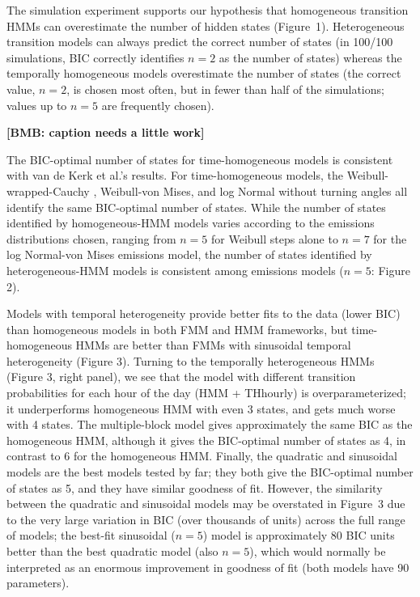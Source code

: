 \documentclass{bmcart}
\newcommand{\bmb}[1]{\textbf{[BMB: #1]}}
\begin{document}
The simulation experiment supports our hypothesis that homogeneous transition HMMs can overestimate the number of hidden states (Figure~1). Heterogeneous transition models can always predict the correct number of states (in 100/100 simulations, BIC correctly identifies $n=2$ as the number of states) whereas the temporally homogeneous models overestimate the number of states (the correct value, $n=2$, is chosen most often, but in fewer than half of the simulations; values up to $n=5$ are frequently chosen).

\bmb{caption needs a little work}


The BIC-optimal number of states for time-homogeneous models is
consistent with van de Kerk et al.'s \cite{kerk2015hidden}
results. For time-homogeneous models, the Weibull-wrapped-Cauchy
\cite{kerk2015hidden}, Weibull-von Mises, and log Normal without
turning angles all identify the same BIC-optimal number of
states. While the number of states identified
by homogeneous-HMM models varies according to the emissions
distributions chosen, ranging from $n=5$ for Weibull
steps alone to $n=7$ for the log Normal-von Mises emissions
model, the number of states identified
by heterogeneous-HMM models
is consistent among emissions models ($n=5$: Figure 2).


Models with temporal heterogeneity provide better fits to the data
(lower BIC) than homogeneous models in both FMM and HMM frameworks,
but time-homogeneous HMMs are better than FMMs with sinusoidal
temporal heterogeneity (Figure 3). Turning to the temporally
heterogeneous HMMs (Figure 3, right panel), we see that the model with
different transition probabilities for each hour of the day (HMM +
THhourly) is overparameterized; it underperforms homogeneous HMM with
even 3 states, and gets much worse with 4 states. The multiple-block
model gives approximately the same BIC as the homogeneous HMM,
although it gives the BIC-optimal number of states as 4, in contrast
to 6 for the homogeneous HMM.  Finally, the quadratic and sinusoidal
models are the best models tested by far; they both give the
BIC-optimal number of states as 5, and they have similar goodness of
fit.  However, the similarity between the quadratic 
and sinusoidal models may be overstated in Figure~3 due to the very large
variation in BIC (over thousands of units) across the full range of
models; the best-fit sinusoidal ($n=5$) model is approximately 80 BIC units
better than the best quadratic model (also $n=5$), which
would normally be interpreted as an enormous improvement in goodness of
fit (both models have 90 parameters).
\end{document}
